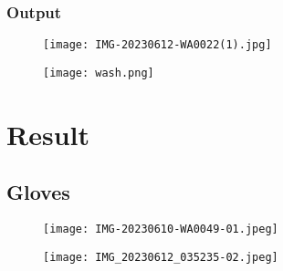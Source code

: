 \documentclass[a4paper,12pt,oneside]{report}
\begin{document}
\subsection{Output}
 \begin{figure}[h]
    \centering
    \begin{minipage}{0.5\textwidth}
        \centering
        \texttt{[image: IMG-20230612-WA0022(1).jpg]}
        \label{fig:flex-sensor}
    \end{minipage}
\end{figure}
 \begin{figure}[h]
    \centering
    \begin{minipage}{0.5\textwidth}
        \centering
        \texttt{[image: wash.png]}
        \label{fig:flex-sensor}
    \end{minipage}
\end{figure}




	
	


	
	
	\newpage
	\chapter{Result}
	\label{chap:Method}
 \section{Gloves}
 \begin{figure}[h]
    \centering
    \begin{minipage}{0.5\textwidth}
        \centering
        \texttt{[image: IMG-20230610-WA0049-01.jpeg]}
        \label{fig:flex-sensor}
    \end{minipage}
\end{figure}

\begin{figure}[h]
    \centering
    \begin{minipage}{0.5\textwidth}
        \centering
        \texttt{[image: IMG\_20230612\_035235-02.jpeg]}
        \label{fig:flex-sensor}
    \end{minipage}
\end{figure}
\\
\end{document}
